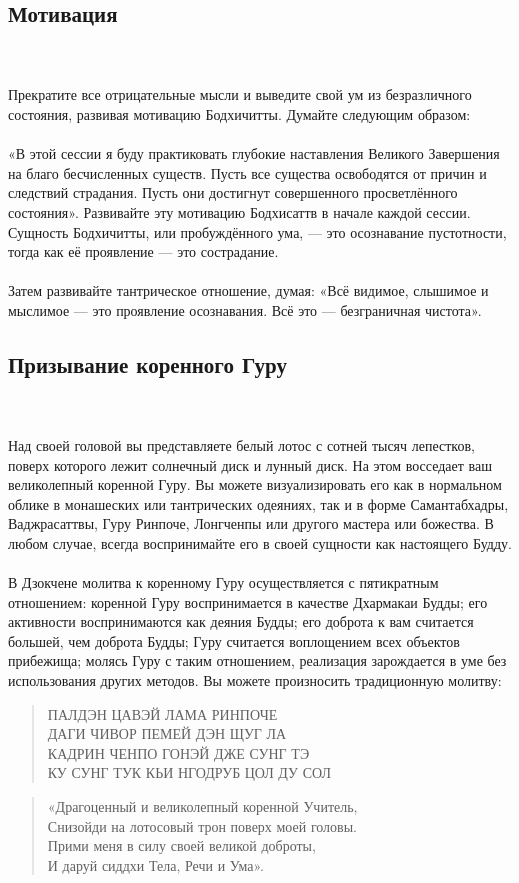 \subsection{Мотивация}
\\ \\ Прекратите все отрицательные мысли и выведите свой ум из безразличного состояния, развивая мотивацию Бодхичитты. Думайте следующим образом:
\\ \\ «В этой сессии я буду практиковать глубокие наставления Великого Завершения на благо бесчисленных существ. Пусть все существа освободятся от причин и следствий страдания. Пусть они достигнут совершенного просветлённого состояния».
\newpage
Развивайте эту мотивацию Бодхисаттв в начале каждой сессии. Сущность Бодхичитты, или пробуждённого ума, — это осознавание пустотности, тогда как её проявление — это сострадание.
\\ \\ Затем развивайте тантрическое отношение, думая: «Всё видимое, слышимое и мыслимое — это проявление осознавания. Всё это — безграничная чистота».
\subsection{Призывание коренного Гуру}
\\ \\ Над своей головой вы представляете белый лотос с сотней тысяч лепестков, поверх которого лежит солнечный диск и лунный диск. На этом восседает ваш великолепный коренной Гуру. Вы можете визуализировать его как в нормальном облике в монашеских или тантрических одеяниях, так и в форме Самантабхадры, Ваджрасаттвы, Гуру Ринпоче, Лонгченпы или другого мастера или божества. В любом случае, всегда воспринимайте его в своей сущности как настоящего Будду.
\\ \\ В Дзокчене молитва к коренному Гуру осуществляется с пятикратным отношением: коренной Гуру воспринимается в качестве Дхармакаи Будды; его активности воспринимаются как деяния Будды; его доброта к вам считается большей, чем доброта Будды; Гуру считается воплощением всех объектов прибежища; молясь Гуру с таким отношением, реализация зарождается в уме без использования других методов. Вы можете произносить традиционную молитву:
\begin{verse}
\small
ПАЛДЭН ЦАВЭЙ ЛАМА РИНПОЧЕ\\
ДАГИ ЧИВОР ПЕМЕЙ ДЭН ЩУГ ЛА\\
КАДРИН ЧЕНПО ГОНЭЙ ДЖЕ СУНГ ТЭ\\
КУ СУНГ ТУК КЬИ НГОДРУБ ЦОЛ ДУ СОЛ
\end{verse}
\normalsize
\begin{verse}
«Драгоценный и великолепный коренной Учитель,\\
Снизойди на лотосовый трон поверх моей головы. \\
Прими меня в силу своей великой доброты,\\
И даруй сиддхи Тела, Речи и Ума».
\end{verse}

